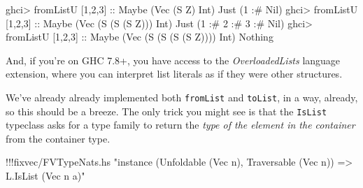 \documentclass[]{article}
\newenvironment{Shaded}{}{}
\newcommand{\DataTypeTok}[1]{\textcolor[rgb]{0.56,0.13,0.00}{{#1}}}
\newcommand{\DecValTok}[1]{\textcolor[rgb]{0.25,0.63,0.44}{{#1}}}
\newcommand{\StringTok}[1]{\textcolor[rgb]{0.25,0.44,0.63}{{#1}}}
\newcommand{\OtherTok}[1]{\textcolor[rgb]{0.00,0.44,0.13}{{#1}}}
\newcommand{\FunctionTok}[1]{\textcolor[rgb]{0.02,0.16,0.49}{{#1}}}
\newcommand{\NormalTok}[1]{{#1}}
\begin{document}
\begin{Shaded}
\begin{Highlighting}[]
\NormalTok{ghci}\FunctionTok{>} \NormalTok{fromListU [}\DecValTok{1}\NormalTok{,}\DecValTok{2}\NormalTok{,}\DecValTok{3}\NormalTok{]}\OtherTok{ ::} \DataTypeTok{Maybe} \NormalTok{(}\DataTypeTok{Vec} \NormalTok{(}\DataTypeTok{S} \DataTypeTok{Z}\NormalTok{) }\DataTypeTok{Int}\NormalTok{)}
\DataTypeTok{Just} \NormalTok{(}\DecValTok{1} \FunctionTok{:#} \DataTypeTok{Nil}\NormalTok{)}
\NormalTok{ghci}\FunctionTok{>} \NormalTok{fromListU [}\DecValTok{1}\NormalTok{,}\DecValTok{2}\NormalTok{,}\DecValTok{3}\NormalTok{]}\OtherTok{ ::} \DataTypeTok{Maybe} \NormalTok{(}\DataTypeTok{Vec} \NormalTok{(}\DataTypeTok{S} \NormalTok{(}\DataTypeTok{S} \NormalTok{(}\DataTypeTok{S} \DataTypeTok{Z}\NormalTok{))) }\DataTypeTok{Int}\NormalTok{)}
\DataTypeTok{Just} \NormalTok{(}\DecValTok{1} \FunctionTok{:#} \DecValTok{2} \FunctionTok{:#} \DecValTok{3} \FunctionTok{:#} \DataTypeTok{Nil}\NormalTok{)}
\NormalTok{ghci}\FunctionTok{>} \NormalTok{fromListU [}\DecValTok{1}\NormalTok{,}\DecValTok{2}\NormalTok{,}\DecValTok{3}\NormalTok{]}\OtherTok{ ::} \DataTypeTok{Maybe} \NormalTok{(}\DataTypeTok{Vec} \NormalTok{(}\DataTypeTok{S} \NormalTok{(}\DataTypeTok{S} \NormalTok{(}\DataTypeTok{S} \NormalTok{(}\DataTypeTok{S} \DataTypeTok{Z}\NormalTok{)))) }\DataTypeTok{Int}\NormalTok{)}
\DataTypeTok{Nothing}
\end{Highlighting}
\end{Shaded}

And, if you're on GHC 7.8+, you have access to the
\emph{OverloadedLists} language extension, where you can interpret list
literals as if they were other structures.

We've already already implemented both \texttt{fromList} and
\texttt{toList}, in a way, already, so this should be a breeze. The only
trick you might see is that the \texttt{IsList} typeclass asks for a
type family to return the \emph{type of the element in the container}
from the container type.

\begin{Shaded}
\begin{Highlighting}[]
\FunctionTok{!!!}\NormalTok{fixvec}\FunctionTok{/}\NormalTok{FVTypeNats.hs }\StringTok{"instance (Unfoldable (Vec n), Traversable (Vec n)) => L.IsList (Vec n a)"}
\end{Highlighting}
\end{Shaded}
\end{document}
